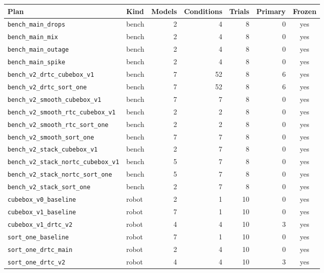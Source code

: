 \begin{tabular}{l l r r r r c}
\toprule
Plan & Kind & Models & Conditions & Trials & Primary & Frozen \\
\midrule
\texttt{bench\_main\_drops} & bench & 2 & 4 & 8 & 0 & yes \\
\texttt{bench\_main\_mix} & bench & 2 & 4 & 8 & 0 & yes \\
\texttt{bench\_main\_outage} & bench & 2 & 4 & 8 & 0 & yes \\
\texttt{bench\_main\_spike} & bench & 2 & 4 & 8 & 0 & yes \\
\texttt{bench\_v2\_drtc\_cubebox\_v1} & bench & 7 & 52 & 8 & 6 & yes \\
\texttt{bench\_v2\_drtc\_sort\_one} & bench & 7 & 52 & 8 & 6 & yes \\
\texttt{bench\_v2\_smooth\_cubebox\_v1} & bench & 7 & 7 & 8 & 0 & yes \\
\texttt{bench\_v2\_smooth\_rtc\_cubebox\_v1} & bench & 2 & 2 & 8 & 0 & yes \\
\texttt{bench\_v2\_smooth\_rtc\_sort\_one} & bench & 2 & 2 & 8 & 0 & yes \\
\texttt{bench\_v2\_smooth\_sort\_one} & bench & 7 & 7 & 8 & 0 & yes \\
\texttt{bench\_v2\_stack\_cubebox\_v1} & bench & 2 & 7 & 8 & 0 & yes \\
\texttt{bench\_v2\_stack\_nortc\_cubebox\_v1} & bench & 5 & 7 & 8 & 0 & yes \\
\texttt{bench\_v2\_stack\_nortc\_sort\_one} & bench & 5 & 7 & 8 & 0 & yes \\
\texttt{bench\_v2\_stack\_sort\_one} & bench & 2 & 7 & 8 & 0 & yes \\
\texttt{cubebox\_v0\_baseline} & robot & 2 & 1 & 10 & 0 & yes \\
\texttt{cubebox\_v1\_baseline} & robot & 7 & 1 & 10 & 0 & yes \\
\texttt{cubebox\_v1\_drtc\_v2} & robot & 4 & 4 & 10 & 3 & yes \\
\texttt{sort\_one\_baseline} & robot & 7 & 1 & 10 & 0 & yes \\
\texttt{sort\_one\_drtc\_main} & robot & 2 & 4 & 10 & 0 & yes \\
\texttt{sort\_one\_drtc\_v2} & robot & 4 & 4 & 10 & 3 & yes \\
\bottomrule
\end{tabular}
